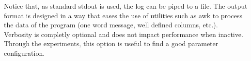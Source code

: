   Notice that, as standard stdout is used, the log can be piped to a file. The
  output format is designed in a way that eases the use of utilities such as
  awk to process the data of the program (one word message, well defined
  columns, etc.).\\

  Verbosity is completly optional and does not impact performance when inactive.
  Through the experiments, this option is useful to find a good parameter
  configuration.

